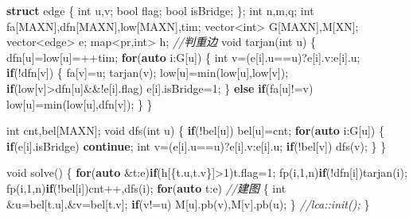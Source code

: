 \documentclass[
]{article}
\newenvironment{Shaded}{}{}
\newcommand{\CommentTok}[1]{\textcolor[rgb]{0.38,0.63,0.69}{\textit{#1}}}
\newcommand{\ControlFlowTok}[1]{\textcolor[rgb]{0.00,0.44,0.13}{\textbf{#1}}}
\newcommand{\DataTypeTok}[1]{\textcolor[rgb]{0.56,0.13,0.00}{#1}}
\newcommand{\DecValTok}[1]{\textcolor[rgb]{0.25,0.63,0.44}{#1}}
\newcommand{\KeywordTok}[1]{\textcolor[rgb]{0.00,0.44,0.13}{\textbf{#1}}}
\newcommand{\NormalTok}[1]{#1}
\begin{document}
\begin{Shaded}
\begin{Highlighting}[]
\KeywordTok{struct}\NormalTok{ edge}
\NormalTok{\{}
    \DataTypeTok{int}\NormalTok{ u,v;}
    \DataTypeTok{bool}\NormalTok{ flag;}
    \DataTypeTok{bool}\NormalTok{ isBridge;}
\NormalTok{\};}
\DataTypeTok{int}\NormalTok{ n,m,q;}
\DataTypeTok{int}\NormalTok{ fa[MAXN],dfn[MAXN],low[MAXN],tim;}
\NormalTok{vector\textless{}}\DataTypeTok{int}\NormalTok{\textgreater{}  G[MAXN],M[XN];}
\NormalTok{vector\textless{}edge\textgreater{} e;}
\NormalTok{map\textless{}pr,}\DataTypeTok{int}\NormalTok{\textgreater{} h; }\CommentTok{//判重边}
\DataTypeTok{void}\NormalTok{ tarjan(}\DataTypeTok{int}\NormalTok{ u)}
\NormalTok{\{}
\NormalTok{    dfn[u]=low[u]=++tim;}
    \ControlFlowTok{for}\NormalTok{(}\KeywordTok{auto}\NormalTok{ i:G[u])}
\NormalTok{    \{}
        \DataTypeTok{int}\NormalTok{ v=(e[i].u==u)?e[i].v:e[i].u;}
        \ControlFlowTok{if}\NormalTok{(!dfn[v])}
\NormalTok{        \{}
\NormalTok{            fa[v]=u;}
\NormalTok{            tarjan(v);}
\NormalTok{            low[u]=min(low[u],low[v]);}
            \ControlFlowTok{if}\NormalTok{(low[v]\textgreater{}dfn[u]\&\&!e[i].flag)}
\NormalTok{                e[i].isBridge=}\DecValTok{1}\NormalTok{;}
\NormalTok{        \}}
        \ControlFlowTok{else} \ControlFlowTok{if}\NormalTok{(fa[u]!=v) low[u]=min(low[u],dfn[v]);}
\NormalTok{    \}}
\NormalTok{\}}

\DataTypeTok{int}\NormalTok{ cnt,bel[MAXN];}
\DataTypeTok{void}\NormalTok{ dfs(}\DataTypeTok{int}\NormalTok{ u)}
\NormalTok{\{}
    \ControlFlowTok{if}\NormalTok{(!bel[u]) bel[u]=cnt;}
    \ControlFlowTok{for}\NormalTok{(}\KeywordTok{auto}\NormalTok{ i:G[u])}
\NormalTok{    \{}
        \ControlFlowTok{if}\NormalTok{(e[i].isBridge) }\ControlFlowTok{continue}\NormalTok{;}
        \DataTypeTok{int}\NormalTok{ v=(e[i].u==u)?e[i].v:e[i].u;}
        \ControlFlowTok{if}\NormalTok{(!bel[v]) dfs(v);}
\NormalTok{    \}}
\NormalTok{\}}

\DataTypeTok{void}\NormalTok{ solve()}
\NormalTok{\{}
    \ControlFlowTok{for}\NormalTok{(}\KeywordTok{auto}\NormalTok{ \&t:e)}\ControlFlowTok{if}\NormalTok{(h[\{t.u,t.v\}]\textgreater{}}\DecValTok{1}\NormalTok{)t.flag=}\DecValTok{1}\NormalTok{;}
\NormalTok{    fp(i,}\DecValTok{1}\NormalTok{,n)}\ControlFlowTok{if}\NormalTok{(!dfn[i])tarjan(i);}
\NormalTok{    fp(i,}\DecValTok{1}\NormalTok{,n)}\ControlFlowTok{if}\NormalTok{(!bel[i])cnt++,dfs(i);}
    \ControlFlowTok{for}\NormalTok{(}\KeywordTok{auto}\NormalTok{ t:e) }\CommentTok{//建图}
\NormalTok{    \{}
        \DataTypeTok{int}\NormalTok{ \&u=bel[t.u],\&v=bel[t.v];}
        \ControlFlowTok{if}\NormalTok{(v!=u) M[u].pb(v),M[v].pb(u);}
\NormalTok{    \}}
    \CommentTok{//lca::init();}
\NormalTok{\}}


\end{Highlighting}
\end{Shaded}
\end{document}
